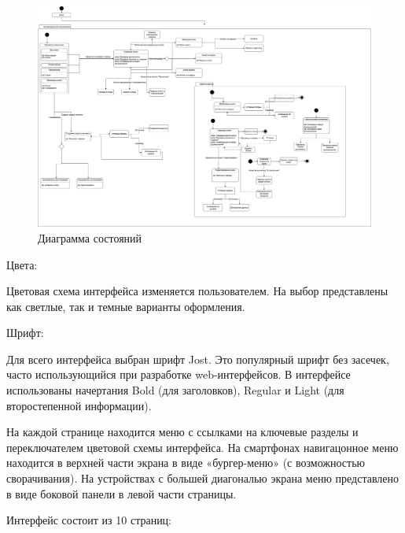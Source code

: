 \documentclass[project.tex]{subfiles}
\begin{document}
\begin{figure}[H]
   \label{pic:2}
   \includegraphics[width=0.9\textheight,height=\textwidth,angle=270,origin=c]{graphics/statechart-uml.png}	
   \caption{Диаграмма состояний}
\end{figure}
\par
Цвета:
\par
Цветовая схема интерфейса изменяется пользователем. На выбор представлены как светлые, так и темные варианты оформления.
\par
Шрифт:
\par
Для всего интерфейса выбран шрифт Jost. Это популярный шрифт без засечек, часто использующийся при разработке web-интерфейсов. В интерфейсе использованы начертания Bold (для заголовков), Regular и Light (для второстепенной информации).
\par
На каждой странице находится меню с ссылками на ключевые разделы и переключателем цветовой схемы интерфейса. На смартфонах навигацонное меню находится в верхней части экрана в виде «бургер-меню» (с возможностью сворачивания).
На устройствах с большей диагональю экрана меню представлено в виде боковой панели в левой части страницы.
\par
\vspace{0.5cm}
Интерфейс состоит из 10 страниц:
\end{document}

